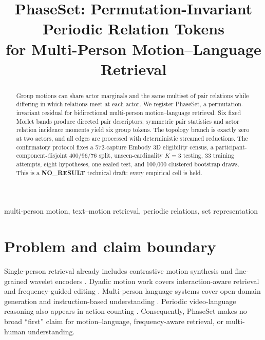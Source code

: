 \documentclass{article}
\title{PhaseSet: Permutation-Invariant Periodic Relation Tokens\\
for Multi-Person Motion--Language Retrieval}
\begin{document}
\ninept
\maketitle
\begin{center}
\end{center}

\begin{abstract}
Group motions can share actor marginals and the same multiset of pair relations
while differing in which relations meet at each actor. We register PhaseSet, a
permutation-invariant residual for bidirectional multi-person motion--language
retrieval. Six fixed Morlet bands produce directed pair descriptors; symmetric
pair statistics and actor--relation incidence moments yield six group tokens.
The topology branch is exactly zero at two actors, and all edges are processed
with deterministic streamed reductions. The confirmatory protocol fixes a
572-capture Embody 3D eligibility census, a participant-component-disjoint
400/96/76 split, unseen-cardinality $K{=}3$ testing, 33 training attempts,
eight hypotheses, one sealed test, and 100,000 clustered bootstrap draws. This
is a \textbf{NO\_RESULT} technical draft: every empirical cell is held.
\end{abstract}

\begin{keywords}
multi-person motion, text--motion retrieval, periodic relations, set representation
\end{keywords}

\section{Problem and claim boundary}
Single-person retrieval already includes contrastive motion synthesis and
fine-grained wavelet encoders \cite{tmr2023,wamo2026}. Dyadic motion work covers
interaction-aware retrieval and frequency-guided editing
\cite{mime2026,interedit2026}. Multi-person language systems cover open-domain
generation and instruction-based understanding
\cite{multimotion2024,socialgen2025,llammo2026}. Periodic video-language
reasoning also appears in action counting \cite{countllm2025}. Consequently,
PhaseSet makes no broad ``first'' claim for motion--language, frequency-aware
retrieval, or multi-human understanding.
\end{document}
